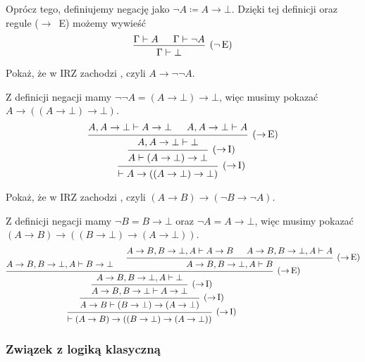 \documentclass[polish,pretty]{angav}
\begin{document}
Oprócz tego, definiujemy negację jako $\neg A \coloneqq A \to \bot$. Dzięki tej definicji oraz regule ($\to\!$~E) możemy wywieść
\[
\begin{prooftree}
    \hypo{\Gamma\vdash A}
    \hypo{\Gamma\vdash \neg A}
    \infer2[($\neg\!$ E)]{\Gamma\vdash \bot}
\end{prooftree}
\]

\begin{example}
    Pokaż, że w IRZ zachodzi , czyli $A \to \neg\neg A$.
\end{example}
\begin{solution}
    Z definicji negacji mamy $\neg\neg A = (A \to \bot) \to \bot$, więc musimy pokazać $A \to ((A\to\bot) \to \bot)$.
    \[
    \begin{prooftree}
        \hypo{A, A\to\bot \vdash A\to\bot}
        \hypo{A, A\to\bot \vdash A}
        \infer2[($\to\!$ E)]{A, A\to\bot \vdash \bot}
        \infer1[($\to\!$ I)]{A \vdash (A\to\bot) \to \bot}
        \infer1[($\to\!$ I)]{\vdash A \to ((A\to\bot) \to \bot)}
    \end{prooftree}
    \]
\end{solution}

\begin{example}
    Pokaż, że w IRZ zachodzi , czyli $(A \to B) \to (\neg B \to \neg A)$.
\end{example}
\begin{solution}
    Z definicji negacji mamy $\neg B = B \to \bot$ oraz $\neg A = A \to \bot$, więc musimy pokazać $(A \to B) \to ((B\to\bot) \to (A\to\bot))$.
    \[
    \begin{prooftree}
        \hypo{A\to B, B \to \bot, A \vdash B \to \bot}
        \hypo{A\to B, B \to \bot, A \vdash A \to B}
        \hypo{A\to B, B \to \bot, A \vdash A}
        \infer2[($\to\!$ E)]{A \to B, B \to \bot, A \vdash B}
        \infer2[($\to\!$ E)]{A \to B, B \to \bot, A \vdash \bot}
        \infer1[($\to\!$ I)]{A \to B, B \to \bot \vdash A\to\bot}
        \infer1[($\to\!$ I)]{A \to B \vdash (B \to \bot) \to (A \to \bot)}
        \infer1[($\to\!$ I)]{\vdash (A \to B) \to ((B \to \bot) \to (A \to \bot))}
    \end{prooftree}
    \]
\end{solution}

\subsubsection{Związek z logiką klasyczną}
\end{document}
